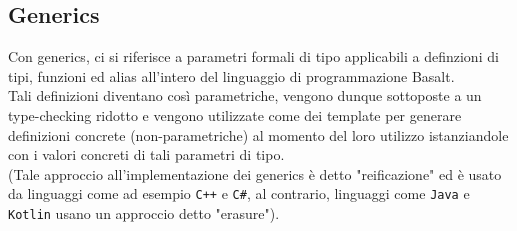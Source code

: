 \subsection{Generics}
Con generics, ci si riferisce a parametri formali di tipo applicabili a definzioni 
di tipi, funzioni ed alias all'intero del linguaggio di programmazione Basalt. \\

Tali definizioni diventano così parametriche, vengono dunque sottoposte a un type-checking ridotto
e vengono utilizzate come dei template per generare definizioni concrete (non-parametriche) al momento
del loro utilizzo istanziandole con i valori concreti di tali parametri di tipo. \\

(Tale approccio all'implementazione dei generics è detto "reificazione"
ed è usato da linguaggi come ad esempio \texttt{C++} e \texttt{C\#}, al contrario, linguaggi come
\texttt{Java} e \texttt{Kotlin} usano un approccio detto "erasure").





